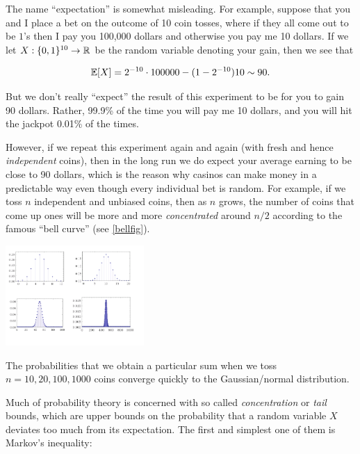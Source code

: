 The name ``expectation'' is somewhat misleading. For example, suppose
that you and I place a bet on the outcome of 10 coin tosses, where if
they all come out to be \(1\)'s then I pay you 100,000 dollars and
otherwise you pay me 10 dollars. If we let
\(X:\{0,1\}^{10} \rightarrow {\mathbb{R}}\) be the random variable denoting your
gain, then we see that

\begin{equation*}

\E[X] = 2^{-10}\cdot 100000 - (1-2^{-10})10 \sim 90 .

\end{equation*}

But we don't really ``expect'' the result of this experiment to be for
you to gain 90 dollars. Rather, 99.9\% of the time you will pay me 10
dollars, and you will hit the jackpot 0.01\% of the times.

However, if we repeat this experiment again and again (with fresh and
hence \emph{independent} coins), then in the long run we do expect your
average earning to be close to 90 dollars, which is the reason why
casinos can make money in a predictable way even though every individual
bet is random. For example, if we toss \(n\) independent and unbiased
coins, then as \(n\) grows, the number of coins that come up ones will
be more and more \emph{concentrated} around \(n/2\) according to the
famous ``bell curve'' (see \cref{bellfig}).

\begin{marginfigure}
\centering
\includegraphics[width=\linewidth, height=1.5in, keepaspectratio]{../figure/binomial.png}
\caption{The probabilities that we obtain a particular sum when we toss
\(n=10,20,100,1000\) coins converge quickly to the Gaussian/normal
distribution.}
\label{bellfig}
\end{marginfigure}

Much of probability theory is concerned with so called
\emph{concentration} or \emph{tail} bounds, which are upper bounds on
the probability that a random variable \(X\) deviates too much from its
expectation. The first and simplest one of them is Markov's inequality:

